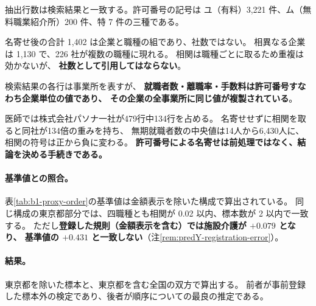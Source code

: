 抽出行数は検索結果と一致する。許可番号の記号は
ユ（有料）3,221 件、ム（無料職業紹介所）200 件、特 7 件の三種である。

名寄せ後の合計 1,402 は企業と職種の組であり、社数ではない。
相異なる企業は 1,130 で、226 社が複数の職種に現れる。
相関は職種ごとに取るため重複は効かないが、
\textbf{社数として引用してはならない}。

\begin{remark}
\label{rem:jinzai-dedup}
検索結果の各行は事業所を表すが、
\textbf{就職者数・離職率・手数料は許可番号すなわち企業単位の値であり、
その企業の全事業所に同じ値が複製されている}。

医師では株式会社パソナ一社が479行中134行を占める。
名寄せせずに相関を取ると同社が134倍の重みを持ち、
無期就職者数の中央値は14人から6,430人に、相関の符号は正から負に変わる。
\textbf{許可番号による名寄せは前処理ではなく、結論を決める手続きである。}
\end{remark}

\paragraph{基準値との照合。}
表\ref{tab:b1-proxy-order}の基準値は金額表示を除いた構成で算出されている。
同じ構成の東京都部分では、四職種とも相関が 0.02 以内、標本数が 2 以内で一致する。
ただし\textbf{登録した規則（金額表示を含む）では施設介護が $+0.079$ となり、
基準値の $+0.431$ と一致しない}（注\ref{rem:predY-registration-error}）。

\paragraph{結果。}
東京都を除いた標本と、東京都を含む全国の双方で算出する。
前者が事前登録した標本外の検定であり、後者が順序についての最良の推定である。

